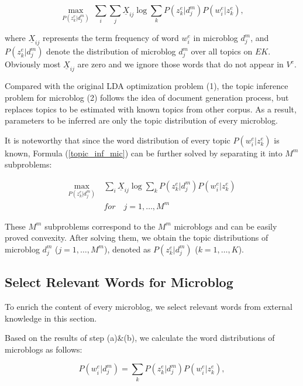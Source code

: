 \documentclass[11pt]{article}
\begin{document}
\begin{equation}\label{topic_inf_mic}
\max_{P(z^{e}_{k}|d^{m}_{j})} \ \sum_{i}\sum_{j}\underline{X}_{ij}\log\sum_{k}P(z^{e}_{k}|d^{m}_{j})P(w^{e}_{i}|z^{e}_{k}),
\end{equation}


\noindent where $\underline{X}_{ij}$ represents the term frequency of word $w^{e}_{i}$ in microblog $d^{m}_{j}$, and $P(z^{e}_{k}|d^{m}_{j})$ denote the distribution of microblog $d^{m}_{j}$ over all topics on $EK$. Obviously most $\underline{X}_{ij}$ are zero and we ignore those words that do not appear in $V^{e}$. 

Compared with the original LDA optimization problem (1), the topic inference problem  for microblog (2) follows the idea of document generation process, but replaces topics to be estimated with known topics from other corpus. As a result, parameters to be inferred are only the topic distribution of every microblog.

It is noteworthy that since the word distribution of every topic $P(w^{e}_{i}|z^{e}_{k})$ is known, Formula (\ref{topic_inf_mic}) can be further solved by separating it into $M^{m}$ subproblems:


\begin{equation}
\begin{split}
\max_{P(z^{e}_{k}|d^{m}_{j})} \ &\sum_{i}\underline{X}_{ij}\log\sum_{k}P(z^{e}_{k}|d^{m}_{j})P(w^{e}_{i}|z^{e}_{k}) \\
&for \quad j=1,\ldots,M^{m}
\end{split}
\end{equation}


These $M^{m}$ subproblems correspond to the $M^{m}$ microblogs and can be easily proved convexity. After solving them, we obtain the topic distributions of microblog $d^{m}_{j}$ ($j=1,\ldots,M^{m}$), denoted as $P(z^{e}_{k}|d^{m}_{j})$ ($k=1,\ldots,K$).

\subsection{Select Relevant Words for Microblog}\label{step_c}

To enrich the content of every microblog, we select relevant words from external knowledge in this section.

Based on the results of step (a)\&(b), we calculate the word distributions of microblogs as follows:


\begin{equation}
P(w^{e}_{i}|d^{m}_{j})=\sum_{k}P(z^{e}_{k}|d^{m}_{j})P(w^{e}_{i}|z^{e}_{k}),
\end{equation}
\end{document}

